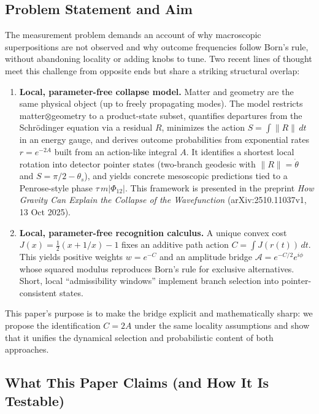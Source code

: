 \documentclass[11pt,letterpaper]{article}
\theoremstyle{definition}
\begin{document}
\subsection{Problem Statement and Aim}

The measurement problem demands an account of why macroscopic superpositions are not observed and why outcome frequencies follow Born's rule, without abandoning locality or adding knobs to tune. Two recent lines of thought meet this challenge from opposite ends but share a striking structural overlap:

\begin{enumerate}
\item \textbf{Local, parameter-free collapse model.} Matter and geometry are the same physical object (up to freely propagating modes). The model restricts matter$\otimes$geometry to a product-state subset, quantifies departures from the Schrödinger equation via a residual $R$, minimizes the action $S=\int\!\|R\|\,dt$ in an energy gauge, and derives outcome probabilities from exponential rates $r=e^{-2A}$ built from an action-like integral $A$. It identifies a shortest local rotation into detector pointer states (two-branch geodesic with $\|R\|=\dot{\theta}$ and $S=\pi/2-\theta_s$), and yields concrete mesoscopic predictions tied to a Penrose-style phase $\tau\,m|\Phi_{12}|$. This framework is presented in the preprint \emph{How Gravity Can Explain the Collapse of the Wavefunction} (arXiv:2510.11037v1, 13 Oct 2025).

\item \textbf{Local, parameter-free recognition calculus.} A unique convex cost $J(x)=\frac{1}{2}(x+1/x)-1$ fixes an additive path action $C=\int J(r(t))\,dt$. This yields positive weights $w=e^{-C}$ and an amplitude bridge $\mathcal{A}=e^{-C/2}e^{i\phi}$ whose squared modulus reproduces Born's rule for exclusive alternatives. Short, local ``admissibility windows'' implement branch selection into pointer-consistent states.
\end{enumerate}

This paper's purpose is to make the bridge explicit and mathematically sharp: we propose the identification $C=2A$ under the same locality assumptions and show that it unifies the dynamical selection and probabilistic content of both approaches.

\subsection{What This Paper Claims (and How It Is Testable)}
\end{document}
